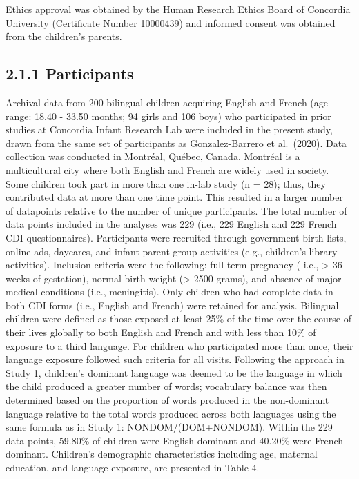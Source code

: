 \documentclass[
  english,
  ,man,floatsintext]{apa6}
\begin{document}
Ethics approval was obtained by the Human Research Ethics Board of Concordia University (Certificate Number 10000439) and informed consent was obtained from the children's parents.

\hypertarget{participants}{%
\subsection{2.1.1 Participants}\label{participants}}

Archival data from 200 bilingual children acquiring English and French (age range: 18.40 - 33.50 months; 94 girls and 106 boys) who participated in prior studies at Concordia Infant Research Lab were included in the present study, drawn from the same set of participants as Gonzalez-Barrero et al.~(2020). Data collection was conducted in Montréal, Québec, Canada. Montréal is a multicultural city where both English and French are widely used in society. Some children took part in more than one in-lab study (n = 28); thus, they contributed data at more than one time point. This resulted in a larger number of datapoints relative to the number of unique participants. The total number of data points included in the analyses was 229 (i.e., 229 English and 229 French CDI questionnaires). Participants were recruited through government birth lists, online ads, daycares, and infant-parent group activities (e.g., children's library activities). Inclusion criteria were the following: full term-pregnancy ( i.e., \textgreater{} 36 weeks of gestation), normal birth weight (\textgreater{} 2500 grams), and absence of major medical conditions (i.e., meningitis). Only children who had complete data in both CDI forms (i.e., English and French) were retained for analysis. Bilingual children were defined as those exposed at least 25\% of the time over the course of their lives globally to both English and French and with less than 10\% of exposure to a third language. For children who participated more than once, their language exposure followed such criteria for all visits. Following the approach in Study 1, children's dominant language was deemed to be the language in which the child produced a greater number of words; vocabulary balance was then determined based on the proportion of words produced in the non-dominant language relative to the total words produced across both languages using the same formula as in Study 1: NONDOM/(DOM+NONDOM). Within the 229 data points, 59.80\% of children were English-dominant and 40.20\% were French-dominant. Children's demographic characteristics including age, maternal education, and language exposure, are presented in Table 4.
\end{document}
